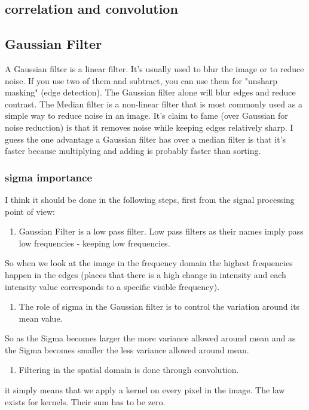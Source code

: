 \documentclass[a4paper]{article}
\begin{document}
\subsection{correlation and convolution}
\label{sec:org6763592}
\subsection{Gaussian Filter}
\label{sec:orgc223ba7}
    A Gaussian filter is a linear filter. It's usually used to blur the image or to reduce noise. If you use two of them and subtract,
    you can use them for "unsharp masking" (edge detection).
    The Gaussian filter alone will blur edges and reduce contrast.
The Median filter is a non-linear filter that is most commonly used as a simple way to reduce noise in an image.
It's claim to fame (over Gaussian for noise reduction)
is that it removes noise while keeping edges relatively sharp.
I guess the one advantage a Gaussian filter has over a median filter is that it's faster because multiplying and adding is probably faster than sorting.

\subsubsection{sigma importance}
\label{sec:org619ed11}
I think it should be done in the following steps, first from the signal processing point of view:

\begin{enumerate}
\item Gaussian Filter is a low pass filter. Low pass filters as their names imply pass low frequencies - keeping low frequencies.
\end{enumerate}
So when we look at the image in the frequency domain the highest frequencies happen in the edges
(places that there is a high change in intensity and each intensity value corresponds to a specific visible frequency).
\begin{enumerate}
\item The role of sigma in the Gaussian filter is to control the variation around its mean value.
\end{enumerate}
So as the Sigma becomes larger the more variance allowed around mean and as the Sigma becomes smaller the
less variance allowed around mean.
\begin{enumerate}
\item Filtering in the spatial domain is done through convolution.
\end{enumerate}
it simply means that we apply a kernel on every pixel in the image. The law exists for kernels. Their sum has to be zero.
\end{document}
